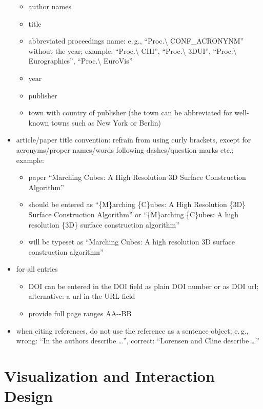\documentclass[review]{vgtc}                 %
\begin{document}
\begin{itemize}
  \begin{itemize}
  \item author names
	\item title
	\item abbreviated proceedings name: e.\,g., ``Proc.\textbackslash{} CONF\_ACRONYNM'' without the year; example: ``Proc.\textbackslash{} CHI'', ``Proc.\textbackslash{} 3DUI'', ``Proc.\textbackslash{} Eurographics'', ``Proc.\textbackslash{} EuroVis''
	\item year
	\item publisher
	\item town with country of publisher (the town can be abbreviated for well-known towns such as New York or Berlin)
  \end{itemize}
\item article/paper title convention: refrain from using curly brackets, except for acronyms/proper names/words following dashes/question marks etc.; example:
\begin{itemize}
	\item paper ``Marching Cubes: A High Resolution 3D Surface Construction Algorithm''
	\item should be entered as ``\{M\}arching \{C\}ubes: A High Resolution \{3D\} Surface Construction Algorithm'' or  ``\{M\}arching \{C\}ubes: A high resolution \{3D\} surface construction algorithm''
	\item will be typeset as ``Marching Cubes: A high resolution 3D surface construction algorithm''
\end{itemize}
\item for all entries
\begin{itemize}
	\item DOI can be entered in the DOI field as plain DOI number or as DOI url; alternative: a url in the URL field
	\item provide full page ranges AA-{}-BB
\end{itemize}
\item when citing references, do not use the reference as a sentence object; e.\,g., wrong: ``In \cite{Lorensen:1987:MCA} the authors describe \dots'', correct: ``Lorensen and Cline \cite{Lorensen:1987:MCA} describe \dots''
\end{itemize}

\section{Visualization and Interaction Design}
\end{document}

